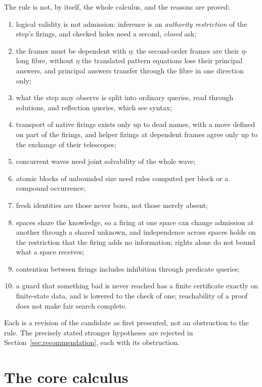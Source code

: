 \documentclass[11pt]{article}
\theoremstyle{remark}
\begin{document}
The rule is not, by itself, the whole calculus, and the reasons are proved:
\begin{enumerate}
\item logical validity is not admission: inference is an \emph{authority restriction} of the step's
  firings, and checked holes need a second, \emph{closed} ask;
\item the frames must be dependent with $\eta$: the second-order frames are their $\eta$-long fibre,
  without $\eta$ the translated pattern equations lose their principal answers, and principal
  answers transfer through the fibre in one direction only;
\item what the step may observe is split into ordinary queries, read through solutions, and
  reflection queries, which see syntax;
\item transport of native firings exists only up to dead names, with a move defined on part of the
  firings, and helper firings at dependent frames agree only up to the exchange of their telescopes;
\item concurrent waves need joint solvability of the whole wave;
\item atomic blocks of unbounded size need rules computed per block or a compound occurrence;
\item fresh identities are those never born, not those merely absent;
\item spaces share the knowledge, so a firing at one space can change admission at another through
  a shared unknown, and independence across spaces holds on the restriction that the firing adds no
  information; rights alone do not bound what a space receives;
\item contention between firings includes inhibition through predicate queries;
\item a guard that something bad is never reached has a finite certificate exactly on finite-state
  data, and is lowered to the check of one; reachability of a proof does not make fair search
  complete.
\end{enumerate}
Each is a revision of the candidate as first presented, not an obstruction to the rule. The
precisely stated stronger hypotheses are rejected in Section~\ref{sec:recommendation}, each with
its obstruction.

\section{The core calculus}\label{sec:core}
\end{document}
